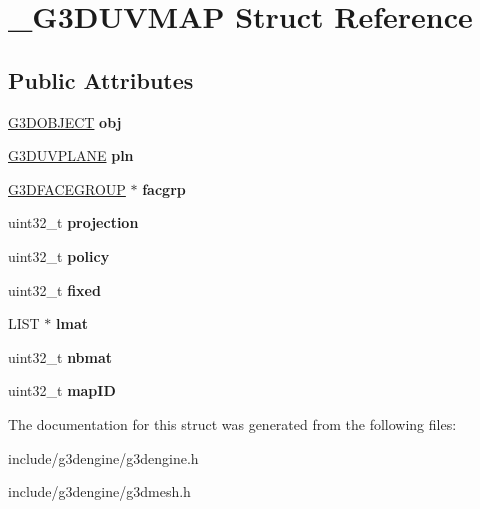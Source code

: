 \hypertarget{struct__G3DUVMAP}{}\section{\+\_\+\+G3\+D\+U\+V\+M\+AP Struct Reference}
\label{struct__G3DUVMAP}
\subsection*{Public Attributes}
\begin{DoxyCompactItemize}
\item 
\mbox{\label{struct__G3DUVMAP_a1f419bcf35aefb789ca956a3ae34f85b}} 
\hyperlink{struct__G3DOBJECT}{G3\+D\+O\+B\+J\+E\+CT} {\bfseries obj}
\item 
\mbox{\label{struct__G3DUVMAP_a95370da582a256832cff1bdc42d48a57}} 
\hyperlink{struct__G3DUVPLANE}{G3\+D\+U\+V\+P\+L\+A\+NE} {\bfseries pln}
\item 
\mbox{\label{struct__G3DUVMAP_a2ea9e8e29d9531dffdbfa285460b0767}} 
\hyperlink{struct__G3DFACEGROUP}{G3\+D\+F\+A\+C\+E\+G\+R\+O\+UP} $\ast$ {\bfseries facgrp}
\item 
\mbox{\label{struct__G3DUVMAP_a8d3e9a35ed961a5793679140b7d1de92}} 
uint32\+\_\+t {\bfseries projection}
\item 
\mbox{\label{struct__G3DUVMAP_a081336c3026912be71bd67d48395255b}} 
uint32\+\_\+t {\bfseries policy}
\item 
\mbox{\label{struct__G3DUVMAP_aa224dad138210874b51fd66835fdb132}} 
uint32\+\_\+t {\bfseries fixed}
\item 
\mbox{\label{struct__G3DUVMAP_a0c37491890e826c954b4dc750a0142b1}} 
L\+I\+ST $\ast$ {\bfseries lmat}
\item 
\mbox{\label{struct__G3DUVMAP_ac6cf1e6bdfc515e769579ba3548e9936}} 
uint32\+\_\+t {\bfseries nbmat}
\item 
\mbox{\label{struct__G3DUVMAP_a2d459189f91ba7b6904935d727fbd2f1}} 
uint32\+\_\+t {\bfseries map\+ID}
\end{DoxyCompactItemize}


The documentation for this struct was generated from the following files\+:\begin{DoxyCompactItemize}
\item 
include/g3dengine/g3dengine.\+h\item 
include/g3dengine/g3dmesh.\+h\end{DoxyCompactItemize}
